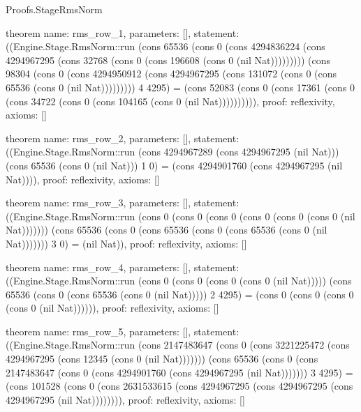 \begin{lexlean}{Proofs.StageRmsNorm}
\begin{semanticmodule}
theorem{
  name: rms_row_1,
  parameters: [],
  statement: ((Engine.Stage.RmsNorm::run (cons 65536 (cons 0 (cons 4294836224 (cons 4294967295 (cons 32768 (cons 0 (cons 196608 (cons 0 (nil Nat))))))))) (cons 98304 (cons 0 (cons 4294950912 (cons 4294967295 (cons 131072 (cons 0 (cons 65536 (cons 0 (nil Nat))))))))) 4 4295) = (cons 52083 (cons 0 (cons 17361 (cons 0 (cons 34722 (cons 0 (cons 104165 (cons 0 (nil Nat)))))))))),
  proof: reflexivity{},
  axioms: []
}

theorem{
  name: rms_row_2,
  parameters: [],
  statement: ((Engine.Stage.RmsNorm::run (cons 4294967289 (cons 4294967295 (nil Nat))) (cons 65536 (cons 0 (nil Nat))) 1 0) = (cons 4294901760 (cons 4294967295 (nil Nat)))),
  proof: reflexivity{},
  axioms: []
}

theorem{
  name: rms_row_3,
  parameters: [],
  statement: ((Engine.Stage.RmsNorm::run (cons 0 (cons 0 (cons 0 (cons 0 (cons 0 (cons 0 (nil Nat))))))) (cons 65536 (cons 0 (cons 65536 (cons 0 (cons 65536 (cons 0 (nil Nat))))))) 3 0) = (nil Nat)),
  proof: reflexivity{},
  axioms: []
}

theorem{
  name: rms_row_4,
  parameters: [],
  statement: ((Engine.Stage.RmsNorm::run (cons 0 (cons 0 (cons 0 (cons 0 (nil Nat))))) (cons 65536 (cons 0 (cons 65536 (cons 0 (nil Nat))))) 2 4295) = (cons 0 (cons 0 (cons 0 (cons 0 (nil Nat)))))),
  proof: reflexivity{},
  axioms: []
}

theorem{
  name: rms_row_5,
  parameters: [],
  statement: ((Engine.Stage.RmsNorm::run (cons 2147483647 (cons 0 (cons 3221225472 (cons 4294967295 (cons 12345 (cons 0 (nil Nat))))))) (cons 65536 (cons 0 (cons 2147483647 (cons 0 (cons 4294901760 (cons 4294967295 (nil Nat))))))) 3 4295) = (cons 101528 (cons 0 (cons 2631533615 (cons 4294967295 (cons 4294967295 (cons 4294967295 (nil Nat)))))))),
  proof: reflexivity{},
  axioms: []
}
\end{semanticmodule}
\end{lexlean}
